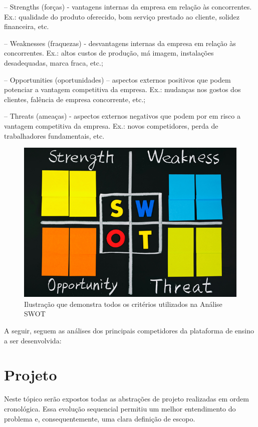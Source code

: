 \documentclass[graduacao,brazil]{ThesisPUC}
\begin{document}
-- Strengths (forças) - vantagens internas da empresa em relação às concorrentes. Ex.:
qualidade do produto oferecido, bom serviço prestado ao cliente, solidez financeira, etc.

-- Weaknesses (fraquezas) - desvantagens internas da empresa em relação às concorrentes.
Ex.: altos custos de produção, má imagem, instalações desadequadas, marca fraca, etc.;

-- Opportunities (oportunidades) – aspectos externos positivos que podem potenciar a
vantagem competitiva da empresa. Ex.: mudanças nos gostos dos clientes, falência de
empresa concorrente, etc.;

-- Threats (ameaças) - aspectos externos negativos que podem por em risco a vantagem
competitiva da empresa. Ex.: novos competidores, perda de trabalhadores fundamentais,
etc.

\begin{figure}[H]
    \centering
    \includegraphics[width=\linewidth]{Imagens/swot.jpg}
    \caption{Ilustração que demonstra todos os critérios utilizados na Análise SWOT}
\end{figure}

A seguir, seguem as an\'{a}lises dos principais competidores da plataforma de ensino a ser
desenvolvida:


\chapter{Projeto}

Neste t\'{o}pico ser\~{a}o expostos todas as abstra\c{c}\~{o}es de projeto realizadas em ordem
cronol\'{o}gica. Essa evolu\c{c}\~{a}o sequencial permitiu um melhor entendimento do problema e,
consequentemente, uma clara defini\c{c}\~{a}o de escopo.
\end{document}
